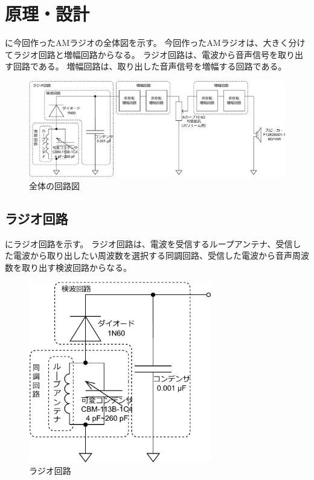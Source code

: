 \documentclass[report.tex]{subfiles}
\begin{document}
\section{原理・設計} \label{sec:theory}

に今回作ったAMラジオの全体図を示す。
今回作ったAMラジオは、大きく分けてラジオ回路と増幅回路からなる。
ラジオ回路は、電波から音声信号を取り出す回路である。
増幅回路は、取り出した音声信号を増幅する回路である。

\begin{figure}[H]
	\centering
	\includegraphics[width=16cm]{fig/all2.pdf}
	\caption{全体の回路図}
	\label{fig:全体の回路図}
\end{figure}

\subsection{ラジオ回路}

にラジオ回路を示す。
ラジオ回路は、電波を受信するループアンテナ、受信した電波から取り出したい周波数を選択する同調回路、受信した電波から音声周波数を取り出す検波回路からなる。

\begin{figure}[H]
	\centering
	\includegraphics[width=8cm]{fig/radio.pdf}
	\caption{ラジオ回路}
	\label{fig:radio-circuit}
\end{figure}
\end{document}
